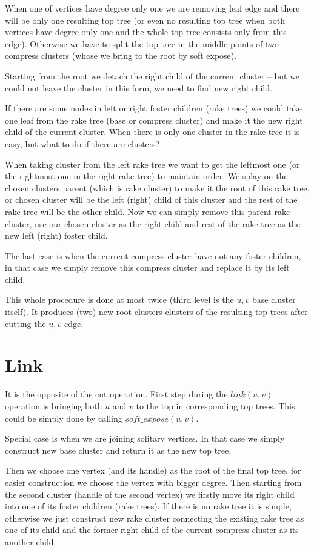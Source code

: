 When one of vertices have degree only one we are removing leaf edge and there
will be only one resulting top tree (or even no resulting top tree when both
vertices have degree only one and the whole top tree consists only from this
edge). Otherwise we have to split the top tree in the middle points of two
compress clusters (whose we bring to the root by soft expose).

Starting from the root we detach the right child of the current cluster -- but
we could not leave the cluster in this form, we need to find new right child.

If there are some nodes in left or right foster children (rake trees) we could
take one leaf from the rake tree (base or compress cluster) and make it the new
right child of the current cluster. When there is only one cluster in the rake
tree it is easy, but what to do if there are clusters?

When taking cluster from the left rake tree we want to get the leftmost one
(or the rightmost one in the right rake tree) to maintain order. We splay on
the chosen clusters parent (which is rake cluster) to make it the root of this
rake tree, or chosen cluster will be the left (right) child of this cluster and
the rest of the rake tree will be the other child. Now we can simply remove this
parent rake cluster, use our chosen cluster as the right child and rest of the
rake tree as the new left (right) foster child.

The last case is when the current compress cluster have not any foster children,
in that case we simply remove this compress cluster and replace it by its left
child.

This whole procedure is done at most twice (third level is the $u,v$ base
cluster itself). It produces (two) new root clusters clusters of the resulting
top trees after cutting the $u,v$ edge.

\section{Link}

It is the opposite of the cut operation. First step during the $link(u,v)$
operation is bringing both $u$ and $v$ to the top in corresponding top trees.
This could be simply done by calling $soft\_expose(u,v)$.

Special case is when we are joining solitary vertices. In that case we simply
construct new base cluster and return it as the new top tree.

Then we choose one vertex (and its handle) as the root of the final top tree,
for easier construction we choose the vertex with bigger degree. Then starting
from the second cluster (handle of the second vertex) we firstly move its right
child into one of its foster children (rake trees). If there is no rake tree it
is simple, otherwise we just construct new rake cluster connecting the existing
rake tree as one of its child and the former right child of the current compress
cluster as its another child.

